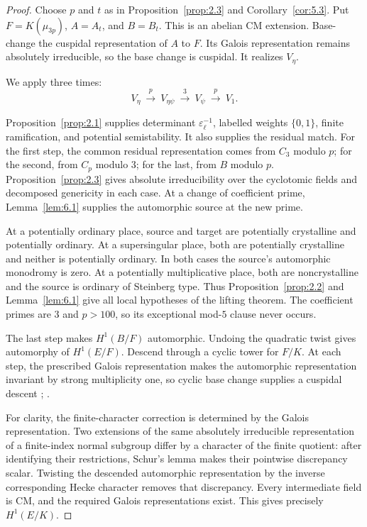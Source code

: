 \documentclass[11pt,a4paper]{article}
\numberwithin{equation}{section}
\begin{document}
\begin{proof}
Choose \(p\) and \(t\) as in Proposition~\ref{prop:2.3} and Corollary~\ref{cor:5.3}. Put \(F=K(\mu_{3p})\), \(A=A_t\), and \(B=B_t\). This is an abelian CM extension. Base-change the cuspidal representation of \(A\) to \(F\). Its Galois representation remains absolutely irreducible, so the base change is cuspidal. It realizes \(V_\eta\).

We apply \cite[Theorem~5.2]{CN} three times:
\begin{equation*}
V_\eta\ \xrightarrow{\ p\ }\ V_{\eta\psi}
\ \xrightarrow{\ 3\ }\ V_\psi
\ \xrightarrow{\ p\ }\ V_1.
\end{equation*}

Proposition~\ref{prop:2.1} supplies determinant \(\varepsilon_\ell^{-1}\), labelled weights \(\{0,1\}\), finite ramification, and potential semistability. It also supplies the residual match. For the first step, the common residual representation comes from \(C_3\) modulo \(p\); for the second, from \(C_p\) modulo \(3\); for the last, from \(B\) modulo \(p\). Proposition~\ref{prop:2.3} gives absolute irreducibility over the cyclotomic fields and decomposed genericity in each case. At a change of coefficient prime, Lemma~\ref{lem:6.1} supplies the automorphic source at the new prime.

At a potentially ordinary place, source and target are potentially crystalline and potentially ordinary. At a supersingular place, both are potentially crystalline and neither is potentially ordinary. In both cases the source's automorphic monodromy is zero. At a potentially multiplicative place, both are noncrystalline and the source is ordinary of Steinberg type. Thus Proposition~\ref{prop:2.2} and Lemma~\ref{lem:6.1} give all local hypotheses of the lifting theorem. The coefficient primes are \(3\) and \(p>100\), so its exceptional mod-\(5\) clause never occurs.

The last step makes \(H^1(B/F)\) automorphic. Undoing the quadratic twist gives automorphy of \(H^1(E/F)\). Descend through a cyclic tower for \(F/K\). At each step, the prescribed Galois representation makes the automorphic representation invariant by strong multiplicity one, so cyclic base change supplies a cuspidal descent \cite{AC}; \cite[Proposition~6.5.13]{ACC}.

For clarity, the finite-character correction is determined by the Galois representation. Two extensions of the same absolutely irreducible representation of a finite-index normal subgroup differ by a character of the finite quotient: after identifying their restrictions, Schur's lemma makes their pointwise discrepancy scalar. Twisting the descended automorphic representation by the inverse corresponding Hecke character removes that discrepancy. Every intermediate field is CM, and the required Galois representations exist. This gives precisely \(H^1(E/K)\).
\end{proof}
\end{document}
